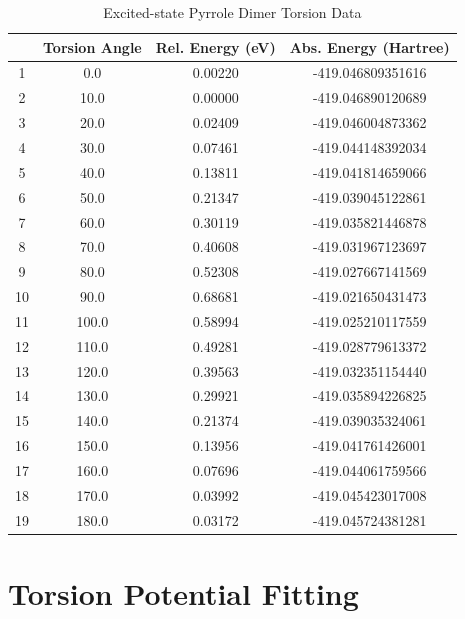 \begin{table}[hbt!]\centering
\caption{Excited-state Pyrrole Dimer Torsion Data}
\renewcommand{\arraystretch}{1.5}
\begin{threeparttable}
\begin{tabular}{cccc}\toprule
  {} & {Torsion Angle} & {Rel. Energy (eV)} & {Abs. Energy (Hartree)} \\ \midrule
    1  & 0.0   & 0.00220 & -419.046809351616\\
    2  & 10.0  & 0.00000 & -419.046890120689\\
    3  & 20.0  & 0.02409 & -419.046004873362\\
    4  & 30.0  & 0.07461 & -419.044148392034\\ \midrule
    5  & 40.0  & 0.13811 & -419.041814659066\\
    6  & 50.0  & 0.21347 & -419.039045122861\\
    7  & 60.0  & 0.30119 & -419.035821446878\\
    8  & 70.0  & 0.40608 & -419.031967123697\\ \midrule
    9  & 80.0  & 0.52308 & -419.027667141569\\
    10 & 90.0  & 0.68681 & -419.021650431473\\
    11 & 100.0 & 0.58994 & -419.025210117559\\
    12 & 110.0 & 0.49281 & -419.028779613372\\ \midrule
    13 & 120.0 & 0.39563 & -419.032351154440\\
    14 & 130.0 & 0.29921 & -419.035894226825\\
    15 & 140.0 & 0.21374 & -419.039035324061\\
    16 & 150.0 & 0.13956 & -419.041761426001\\ \midrule
    17 & 160.0 & 0.07696 & -419.044061759566\\
    18 & 170.0 & 0.03992 & -419.045423017008\\
    19 & 180.0 & 0.03172 & -419.045724381281\\ \bottomrule
\end{tabular}
\begin{tablenotes}
\item
\end{tablenotes}
\end{threeparttable}
\end{table}

\clearpage

\section{Torsion Potential Fitting}
\label{sec:TPF}
